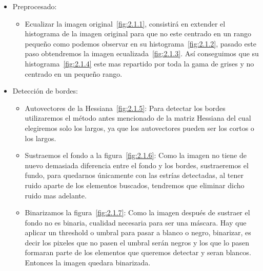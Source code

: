 \begin{itemize}
\item Preprocesado:
	\begin{itemize}
		\item Ecualizar la imagen original~\ref{fig:2.1.1}, consistirá en extender el histograma de la imagen original para que no este centrado en un rango pequeño como podemos observar en su histograma~\ref{fig:2.1.2}, pasado este paso obtendremos la imagen ecualizada~\ref{fig:2.1.3}.
Así conseguimos que su histograma~\ref{fig:2.1.4} este mas repartido por toda la gama de grises y no centrado en un pequeño rango.
	\end{itemize}
	
\item Detección de bordes:
	\begin{itemize}
		\item Autovectores de la Hessiana~\ref{fig:2.1.5}:
Para detectar los bordes utilizaremos el método antes mencionado de la matriz Hessiana del cual elegiremos solo los largos, ya que los autovectores pueden ser los cortos o los largos. 
		\item Sustraemos el fondo a la figura~\ref{fig:2.1.6}:
Como la imagen no tiene de nuevo demasiada diferencia entre el fondo y los bordes, sustraeremos el fundo, para quedarnos únicamente con las estrías detectadas, al tener ruido aparte de los elementos buscados, tendremos que eliminar dicho ruido mas adelante.
		\item Binarizamos la figura~\ref{fig:2.1.7}:
Como la imagen después de sustraer el fondo no es binaria, cualidad necesaria para ser una máscara.
Hay que aplicar un threshold o umbral para pasar a blanco o negro, binarizar, es decir los pixeles que no pasen el umbral serán negros y los que lo pasen formaran parte de los elementos que queremos detectar y seran blancos.
Entonces la imagen quedara binarizada.
	\end{itemize}
	

\end{itemize}
